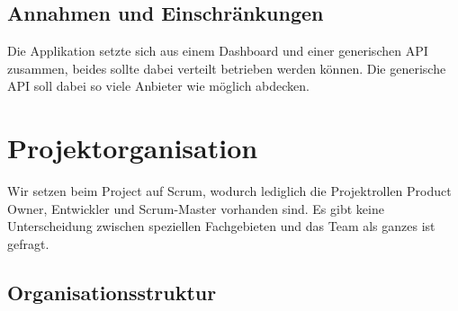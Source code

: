 \documentclass[11pt]{scrartcl}
\begin{document}
\subsection{Annahmen und Einschränkungen}
Die Applikation setzte sich aus einem Dashboard und einer generischen API 
zusammen, beides sollte dabei verteilt betrieben werden können.
Die generische API soll dabei so viele Anbieter wie möglich abdecken.
\section{Projektorganisation}
Wir setzen beim Project auf Scrum, wodurch lediglich die Projektrollen Product 
Owner, Entwickler und Scrum-Master vorhanden sind.
Es gibt keine Unterscheidung zwischen speziellen Fachgebieten und das Team 
als ganzes ist gefragt.
\subsection{Organisationsstruktur}
\end{document}
